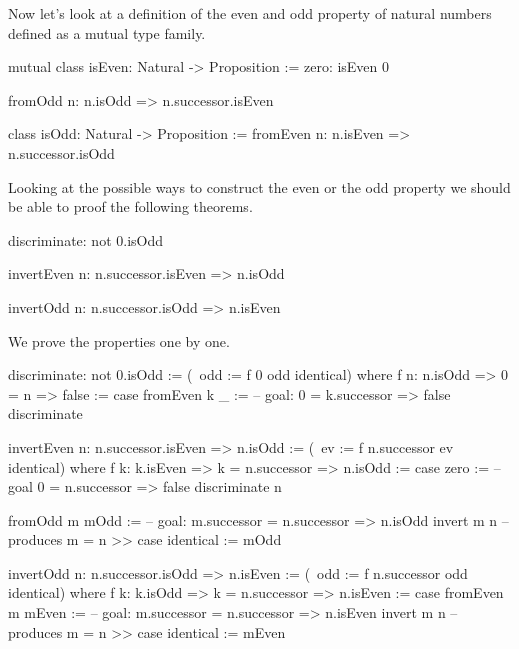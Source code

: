 Now let's look at a definition of the even and odd property of natural numbers
defined as a mutual type family.
%
\begin{alba}
    mutual
        class
            isEven: Natural -> Proposition
        :=
            zero: isEven 0

            fromOdd n: n.isOdd => n.successor.isEven

        class
            isOdd: Natural -> Proposition
        :=
            fromEven n: n.isEven => n.successor.isOdd
\end{alba}
%
Looking at the possible ways to construct the even or the odd property we should
be able to proof the following theorems.
%
\begin{alba}
    discriminate: not 0.isOdd

    invertEven n: n.successor.isEven => n.isOdd

    invertOdd  n: n.successor.isOdd  => n.isEven
\end{alba}


\noindent We prove the properties one by one.

\begin{alba}
    discriminate: not 0.isOdd :=
        (\ odd := f 0 odd identical)
        where
        f n: n.isOdd => 0 = n => false
        :=
            case
                fromEven k _ :=
                    -- goal: 0 = k.successor => false
                    discriminate

    invertEven n: n.successor.isEven => n.isOdd
    :=
        (\ ev := f n.successor ev identical)
        where
        f k: k.isEven => k = n.successor => n.isOdd
        :=
            case
                zero :=
                    -- goal 0 = n.successor => false
                    discriminate n

                fromOdd m mOdd :=
                    -- goal: m.successor = n.successor => n.isOdd
                    invert m n -- produces m = n
                    >>
                    case
                        identical := mOdd

    invertOdd n: n.successor.isOdd => n.isEven
    :=
        (\ odd := f n.successor odd identical)
        where
        f k: k.isOdd => k = n.successor => n.isEven
        :=
            case
                fromEven m mEven :=
                    -- goal: m.successor = n.successor => n.isEven
                    invert m n -- produces m = n
                    >>
                    case
                        identical := mEven
\end{alba}

